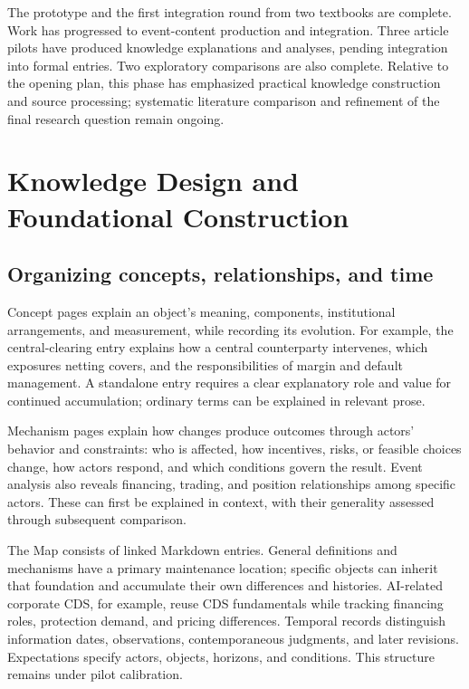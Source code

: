\documentclass[11pt,letterpaper]{article}
\begin{document}
The prototype and the first integration round from two textbooks are complete. Work has progressed to event-content production and integration. Three article pilots have produced knowledge explanations and analyses, pending integration into formal entries. Two exploratory comparisons are also complete. Relative to the opening plan, this phase has emphasized practical knowledge construction and source processing; systematic literature comparison and refinement of the final research question remain ongoing.

\newpage
\section{Knowledge Design and Foundational Construction}

\subsection{Organizing concepts, relationships, and time}

Concept pages explain an object's meaning, components, institutional arrangements, and measurement, while recording its evolution. For example, the central-clearing entry explains how a central counterparty intervenes, which exposures netting covers, and the responsibilities of margin and default management. A standalone entry requires a clear explanatory role and value for continued accumulation; ordinary terms can be explained in relevant prose.

Mechanism pages explain how changes produce outcomes through actors' behavior and constraints: who is affected, how incentives, risks, or feasible choices change, how actors respond, and which conditions govern the result. Event analysis also reveals financing, trading, and position relationships among specific actors. These can first be explained in context, with their generality assessed through subsequent comparison.

The Map consists of linked Markdown entries. General definitions and mechanisms have a primary maintenance location; specific objects can inherit that foundation and accumulate their own differences and histories. AI-related corporate CDS, for example, reuse CDS fundamentals while tracking financing roles, protection demand, and pricing differences. Temporal records distinguish information dates, observations, contemporaneous judgments, and later revisions. Expectations specify actors, objects, horizons, and conditions. This structure remains under pilot calibration.
\end{document}
